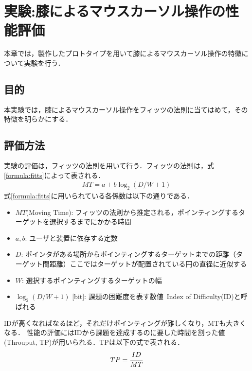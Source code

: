 \chapter{実験:膝によるマウスカーソル操作の性能評価} 
本章では，製作したプロトタイプを用いて膝によるマウスカーソル操作の特徴について実験を行う．
\section{目的}
本実験では，膝によるマウスカーソル操作をフィッツの法則に当てはめて，その特徴を明らかにする．
\section{評価方法}
実験の評価は，フィッツの法則\cite{fitts}を用いて行う．フィッツの法則は，式\ref{formula:fitts}によって表される．
\begin{eqnarray}
	MT = a + b\log_2{(D/W + 1)}
	\label{formula:fitts}
\end{eqnarray}
式\ref{formula:fitts}に用いられている各係数は以下の通りである．
\begin{itemize}
	\item {$MT$(Moving Time): }フィッツの法則から推定される，ポインティングするターゲットを選択するまでにかかる時間
	\item {$a,b$: }ユーザと装置に依存する定数
	\item {$D$: }ポインタがある場所からポインティングするターゲットまでの距離（ターゲット間距離）ここではターゲットが配置されている円の直径に近似する
	\item {$W$: }選択するポインティングするターゲットの幅
	\item { $\log_2{(D/W + 1)}$ [bit]: } 課題の困難度を表す数値\ Index of Difficulty(ID)と呼ばれる
\end{itemize}
IDが高くなればなるほど，それだけポインティングが難しくなり，MTも大きくなる．
性能の評価にはIDから課題を達成するのに要した時間を割った値(Throuput, TP)が用いられる．TPは以下の式で表される．
\begin{eqnarray}
	TP = \cfrac{ID}{MT}
	\label{formula:fitts}
\end{eqnarray}
